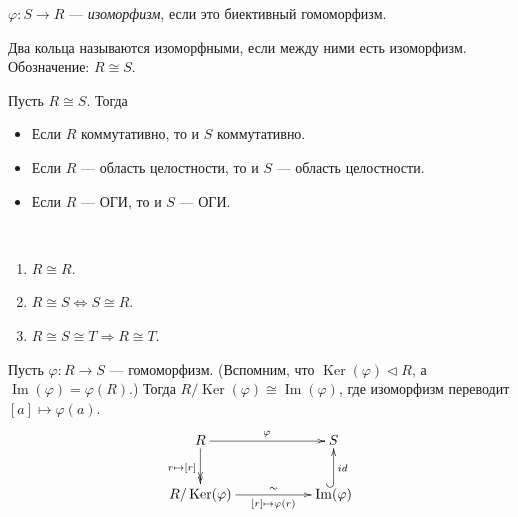 \documentclass[12pt,a4paper]{article}
\DeclareMathOperator{\Img}{Im}
\DeclareMathOperator{\Ker}{Ker}
\begin{document}
    \begin{definition}
        $\varphi: S \to R$ --- \emph{изоморфизм}, если это биективный гомоморфизм.
    \end{definition}

    \begin{definition}
        Два кольца называются изоморфными, если между ними есть изоморфизм. Обозначение: $R \cong S$.
    \end{definition}

    \begin{statement}
        Пусть $R \cong S$. Тогда
        \begin{itemize}
            \item Если $R$ коммутативно, то и $S$ коммутативно.
            \item Если $R$ --- область целостности, то и $S$ --- область целостности.
            \item Если $R$ --- ОГИ, то и $S$ --- ОГИ.
        \end{itemize}
    \end{statement}

    \begin{statement}\ 
        \begin{enumerate}
            \item $R \cong R$.
            \item $R \cong S \Leftrightarrow S \cong R$.
            \item $R \cong S \cong T \Rightarrow R \cong T$.
        \end{enumerate}
    \end{statement}

    \begin{theorem}[о гомоморфизме]
        Пусть $\varphi: R \to S$ --- гомоморфизм. (Вспомним, что $\Ker(\varphi) \triangleleft R$, а $\Img(\varphi) = \varphi(R)$.) Тогда $R/\Ker(\varphi) \cong \Img(\varphi)$, где изоморфизм переводит $[a] \mapsto \varphi(a)$.
        \[
            \xymatrix{
                R \ar@{->>}[d]_{r \mapsto [r]} \ar[rr]^\varphi && S\\
                R/\Ker(\varphi) \ar[rr]^-\sim_-{[r] \mapsto \varphi(r)} && \Img(\varphi) \ar@{^{(}->}[u]_{id}
            }
        \]
    \end{theorem}
\end{document}
